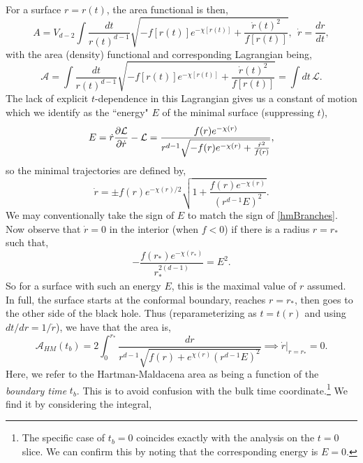 \documentclass[12pt,a4paper]{article}
\begin{document}
\noindent For a surface $r = r(t)$, the area functional is then,
\begin{equation}
A = V_{d-2}\int \frac{dt}{r(t)^{d-1}} \sqrt{-f[r(t)] e^{-\chi[r(t)]} + \frac{\dot{r}(t)^2}{f[r(t)]}},\ \ \dot{r} = \frac{dr}{dt},\label{areaTimeInt}
\end{equation}
with the area (density) functional and corresponding Lagrangian being,
\begin{equation}
\mathcal{A}= \int \frac{dt}{r(t)^{d-1}} \sqrt{-f[r(t)] e^{-\chi[r(t)]} + \frac{\dot{r}(t)^2}{f[r(t)]}} = \int dt\,\mathcal{L}.\label{timeArea}
\end{equation}
The lack of explicit $t$-dependence in this Lagrangian gives us a constant of motion which we identify as the ``energy" $E$ of the minimal surface (suppressing $t$),
\begin{equation}
E = \dot{r}\pdv{\mathcal{L}}{\dot{r}} - \mathcal{L} = \frac{f(r)e^{-\chi(r)}}{r^{d-1}\sqrt{-f(r)e^{-\chi(r)} + \frac{\dot{r}^2}{f(r)}}},
\end{equation}
so the minimal trajectories are defined by,
\begin{equation}
\dot{r} = \pm f(r)e^{-\chi(r)/2}\sqrt{1+\frac{f(r)e^{-\chi(r)}}{(r^{d-1}E)^2}}.\label{hmBranches}
\end{equation}
We may conventionally take the sign of $E$ to match the sign of \eqref{hmBranches}. Now observe that $\dot{r} = 0$ in the interior (when $f < 0$) if there is a radius $r = r_{*}$ such that,
\begin{equation}
-\frac{f(r_*)e^{-\chi(r_*)}}{r_*^{2(d-1)}} = E^2.\label{energyRStar}
\end{equation}
So for a surface with such an energy $E$, this is the maximal value of $r$ assumed. In full, the surface starts at the conformal boundary, reaches $r = r_*$, then goes to the other side of the black hole. Thus (reparameterizing as $t = t(r)$ and using $dt/dr = 1/\dot{r}$), we have that the area is,
\begin{equation}
\mathcal{A}_{HM}(t_b) = 2\int_0^{r_*} \frac{dr}{r^{d-1}\sqrt{f(r) + e^{\chi(r)}(r^{d-1}E)^2}} \implies \dot{r}|_{r = r_*} = 0.
\end{equation}
Here, we refer to the Hartman-Maldacena area as being a function of the \textit{boundary time} $t_b$. This is to avoid confusion with the bulk time coordinate.\footnote{The specific case of $t_b = 0$ coincides exactly with the analysis on the $t = 0$ slice. We can confirm this by noting that the corresponding energy is $E = 0$.} We find it by considering the integral,
\end{document}
